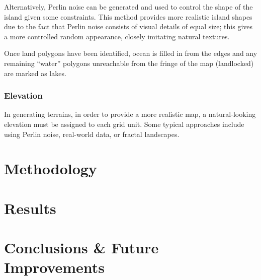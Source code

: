 Alternatively, Perlin noise can be generated and used to control the shape of the island given some constraints. This method provides more realistic island shapes due to the fact that Perlin noise consists of visual details of equal size; this gives a more controlled random appearance, closely imitating natural textures. 

Once land polygons have been identified, ocean is filled in from the edges and any remaining ``water'' polygons unreachable from the fringe of the map (landlocked) are marked as lakes. 

\subsubsection{Elevation}
In generating terrains, in order to provide a more realistic map, a natural-looking elevation must be assigned to each grid unit. Some typical approaches include using Perlin noise, real-world data, or fractal landscapes. 

\section{Methodology}

\section{Results}

\section{Conclusions \& Future Improvements}



